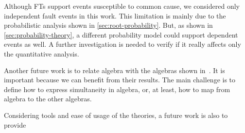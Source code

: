 Although \acp{FT} support events susceptible to common cause, we considered only independent fault events in this work.
This limitation is mainly due to the probabilistic analysis shown in \cref{sec:root-probability}.
But, as shown in \cref{sec:probability-theory}, a different probability model could support dependent events as well.
A further investigation is needed to verify if it really affects only the quantitative analysis.

Another future work is to relate \ac{algebra} with the algebras shown in~\cite{Merle2010,Walker2009}.
It is important because we can benefit from their results.
The main challenge is to define how to express simultaneity in \ac{algebra}, or, at least, how to map from \ac{algebra} to the other algebras.

Considering tools and ease of usage of the theories, a future work is also to provide %







